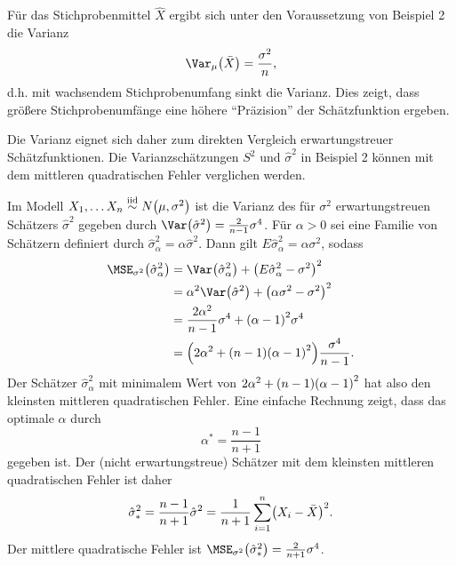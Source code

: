 \documentclass{lecture}
\begin{document}
    \begin{example}
        Für das Stichprobenmittel \(\hat{X}\) ergibt sich unter den Voraussetzung von Beispiel 2 die Varianz
        \[
            \Var_\mu\parentheses*{\bar{X}} = \frac{\sigma^2}{n},
        \]
        d.h. mit wachsendem Stichprobenumfang sinkt die Varianz.
        Dies zeigt, dass größere Stichprobenumfänge eine höhere ``Präzision'' der Schätzfunktion ergeben.
    \end{example}

    Die Varianz eignet sich daher zum direkten Vergleich erwartungstreuer Schätzfunktionen.
    Die Varianzschätzungen \(S^2\) und \(\hat{\sigma}^2\) in Beispiel 2 können mit dem mittleren quadratischen Fehler verglichen werden.

    \begin{example}
        Im Modell \(X_1, \ldots X_n \stackrel{\text{iid}}{\sim} N\parentheses*{\mu, \sigma^2}\) ist die Varianz des für \(\sigma^2\) erwartungstreuen Schätzers \(\hat{\sigma}^2\) gegeben durch \(\Var\parentheses*{\hat{\sigma}^2} = \frac{2}{n - 1}\sigma^4\).
        Für \(\alpha > 0\) sei eine Familie von Schätzern definiert durch \(\hat{\sigma}_\alpha^2 = \alpha\hat{\sigma}^2\).
        Dann gilt \(E\hat{\sigma}_\alpha^2 = \alpha\sigma^2\), sodass
        \begin{align*}
            \MSE_{\sigma^2}\parentheses*{\hat{\sigma}_\alpha^2} &= \Var\parentheses*{\hat{\sigma}_\alpha^2} + \parentheses*{E\hat{\sigma}_\alpha^2 - \sigma^2}^2\\
            &= \alpha^2 \Var\parentheses*{\hat{\sigma}^2} + \parentheses*{\alpha\sigma^2 - \sigma^2}^2\\
            &= \frac{2\alpha^2}{n - 1}\sigma^4 + \parentheses*{\alpha - 1}^2 \sigma^4\\
            &= \parentheses*{2\alpha^2 + \parentheses*{n - 1}\parentheses*{\alpha - 1}^2}\frac{\sigma^4}{n - 1}.
        \end{align*}
        Der Schätzer \(\hat{\sigma}_\alpha^2\) mit minimalem Wert von \(2\alpha^2 + \parentheses*{n - 1}\parentheses*{\alpha - 1}^2\) hat also den kleinsten mittleren quadratischen Fehler.
        Eine einfache Rechnung zeigt, dass das optimale \(\alpha\) durch
        \[
            \alpha^* = \frac{n - 1}{n + 1}
        \]
        gegeben ist.
        Der (nicht erwartungstreue) Schätzer mit dem kleinsten mittleren quadratischen Fehler ist daher
        \[
            \hat{\sigma}_*^2 = \frac{n - 1}{n + 1}\hat{\sigma}^2 = \frac{1}{n + 1}\sum_{i = 1}^n \parentheses*{X_i - \bar{X}}^2.
        \]
        Der mittlere quadratische Fehler ist \(\MSE_{\sigma^2}\parentheses*{\hat{\sigma}_*^2} = \frac{2}{n + 1}\sigma^4\).
    \end{example}
\end{document}
